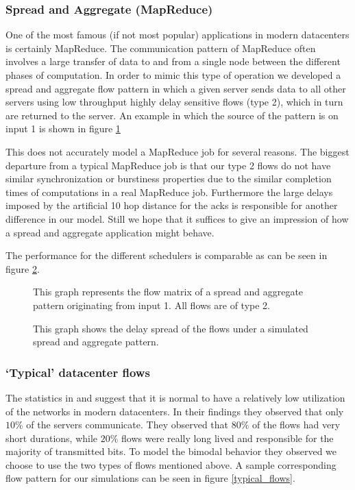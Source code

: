 \documentclass{IEEEtran}%
\begin{document}
\subsubsection{Spread and Aggregate (MapReduce)}
One of the most famous (if not most popular) applications in modern datacenters is certainly MapReduce.  The communication pattern of MapReduce often involves a large transfer of data to and from a single node between the different phases of computation.  In order to mimic this type of operation we developed a spread and aggregate flow pattern in which a given server sends data to all other servers using low throughput highly delay sensitive flows (type 2), which in turn are returned to the server.   An example in which the source of the pattern is on input 1 is shown in figure \ref{spreadagg}

This does not accurately model a MapReduce job for several reasons.  The biggest departure from a typical MapReduce job is that our type 2 flows do not have similar synchronization or burstiness properties due to the similar completion times of computations in a real MapReduce job.  Furthermore the large delays imposed by the artificial 10 hop distance for the acks is responsible for another difference in our model.  Still we hope that it suffices to give an impression of how a spread and aggregate application might behave.

The performance for the different schedulers is comparable as can be seen in figure \ref{spreadagg_delay_spread}.

\begin{figure}%
	\caption{This graph represents the flow matrix of a spread and aggregate pattern originating from input 1.  All flows are of type 2.}
	\label{spreadagg}
\end{figure}

\begin{figure}%
	\caption{This graph shows the delay spread of the flows under a simulated spread and aggregate pattern.}
	\label{spreadagg_delay_spread}
\end{figure}

\subsubsection{`Typical' datacenter flows}
The statistics in \cite{Benson} and \cite{Kandula} suggest that it is normal to have a relatively low utilization of the networks in modern datacenters.  In their findings they observed that only $10\%$ of the servers communicate.  They observed that $80\%$ of the flows had very short durations, while $20\%$ flows were really long lived and responsible for the majority of transmitted bits.  To model the bimodal behavior they observed we choose to use the two types of flows mentioned above.  A sample corresponding flow pattern for our simulations can be seen in figure \ref{typical_flows}.
\end{document}
